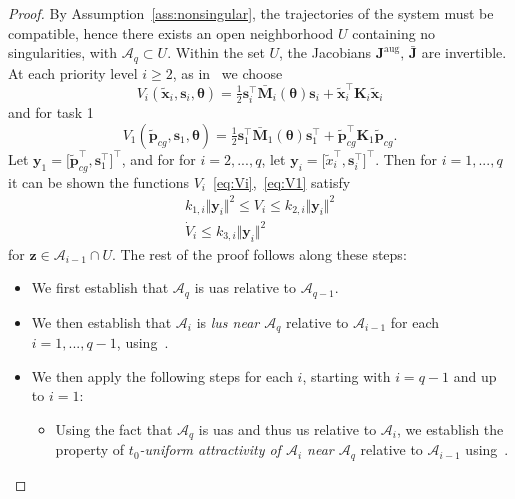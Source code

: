 \documentclass[../main.tex]{subfiles}
\begin{document}
\begin{proof}
By Assumption~\ref{ass:nonsingular}, the trajectories of the system must be compatible, hence there exists an open neighborhood $U$ containing no singularities, with $\mathcal{A}_q \subset U$. Within the set $U$, the Jacobians $\bm{J}^{\textrm{aug}},\, \bar{\bm{J}}$ are invertible. At each priority level $i \geq 2$, as in~\cite{Saeboe2022} we choose
\begin{equation}\label{eq:Vi}
    V_i(\tilde{\bm{x}}_i,\bm{s}_i,\bm{\theta}) = \tfrac{1}{2} \bm{s}_i^\top \bar{\bm{M}}_i(\bm{\theta}) \bm{s}_i + \tilde{\bm{x}}_i^\top \bm{K}_i \tilde{\bm{x}}_i
\end{equation}
and for task 1
\begin{equation}\label{eq:V1}
    V_1(\tilde{\bm{p}}_{cg}, \bm{s}_1,\bm{\theta}) = \tfrac{1}{2} \bm{s}_1^\top \bar{\bm{M}}_1(\bm{\theta}) \bm{s}_1^\top + \tilde{\bm{p}}_{cg}^\top \bm{K}_1 \tilde{\bm{p}}_{cg} .
\end{equation}
Let $\bm{y}_1 = \bigl[ \tilde{\bm{p}}_{cg}^\top, \bm{s}_1^\top \bigr]^\top$, and for for $i=2,...,q$, let $\bm{y}_i = \bigl[\tilde{x}_i^\top, \bm{s}_i^\top\bigr]^\top$. Then for $i=1,...,q$ it can be shown the functions $V_i$~\eqref{eq:Vi},~\eqref{eq:V1} satisfy
\begin{subequations}\label{eq:Vi_bounds}
    \begin{align}
        k_{1,i} \Vert \bm{y}_i \Vert^2 \leq V_i \leq  k_{2,i} \Vert \bm{y}_i \Vert^2 \label{eq:Vi_bounds_lowup}\\
        \dot{V}_i \leq k_{3,i} \Vert \bm{y}_i \Vert^2 \label{eq:Vi_bounds_dot}
    \end{align}  
\end{subequations}
for $\bm{z} \in \mathcal{A}_{i-1} \cap U$. 
The rest of the proof follows along these steps:\vspace{-3pt}
\begin{itemize}
    \item[1)] We first establish that $\mathcal{A}_q$ is \gls{uas} relative to $\mathcal{A}_{q-1}$.
    \item[2)] We then establish that $\mathcal{A}_i$ is \textit{\gls{lus} near $\mathcal{A}_q$} relative to $\mathcal{A}_{i-1}$ for each $i=1,...,q-1$, using~\cite[Proposition 25]{Maggiore2023}.
    \item[3)] We then apply the following steps for each $i$, starting with $i=q-1$ and up to $i=1$:
    \begin{itemize}
        \item[3a)] Using the fact that $\mathcal{A}_q$ is \gls{uas} and thus \gls{us} relative to $\mathcal{A}_{i}$, we establish the property of \textit{$t_0$-uniform attractivity of $\mathcal{A}_i$ near $\mathcal{A}_q$} relative to $\mathcal{A}_{i-1}$ using~\cite[Corollary 29]{Maggiore2023}.

\end{itemize}
\end{itemize}
\end{proof}
\end{document}
